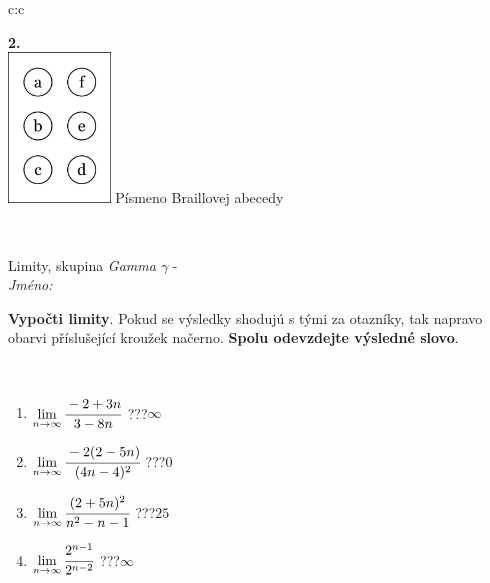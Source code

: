 \documentclass[10pt]{report}
\begin{document}
\begin{tabular}{c:c}
\begin{minipage}[c][104.5mm][t]{0.5\linewidth}
\begin{center}
\begin{minipage}{0.20\linewidth}
\begin{center}
{\Huge\bfseries 2.} \\[2mm]
\includegraphics[height=40mm]{../images/braille.png}
{\small Písmeno Braillovej abecedy}
\end{center}
\end{minipage}
\end{center}
\end{minipage}
\\ \hdashline
\begin{minipage}[c][104.5mm][t]{0.5\linewidth}
\begin{center}
\vspace{7mm}
{\huge Limity, skupina \textit{Gamma $\gamma$} -}\\[5mm]
\textit{Jméno:}\phantom{xxxxxxxxxxxxxxxxxxxxxxxxxxxxxxxxxxxxxxxxxxxxxxxxxxxxxxxxxxxxxxxxx}\\[5mm]
\begin{minipage}{0.95\linewidth}
\begin{center}
\textbf{Vypočti limity}. Pokud se výsledky shodujú s tými za otazníky, tak napravo\\obarvi příslušející kroužek načerno. \textbf{Spolu odevzdejte výsledné slovo}.
\end{center}
\end{minipage}
\\[1mm]
\begin{minipage}{0.79\linewidth}
\begin{center}
\begin{varwidth}{\linewidth}
\begin{enumerate}
\normalsize
\item $\lim\limits_{n\to\infty}\cfrac{-2+3n}{3-8n}$\quad \dotfill\; ???\;\dotfill \quad $\infty$
\item $\lim\limits_{n\to\infty}\cfrac{-2(2-5n)}{(4n-4)^2}$\quad \dotfill\; ???\;\dotfill \quad $0$
\item $\lim\limits_{n\to\infty}\cfrac{(2+5n)^2}{n^2-n-1}$\quad \dotfill\; ???\;\dotfill \quad $25$
\item $\lim\limits_{n\to\infty}\cfrac{2^{n-1}}{2^{n-2}}$\quad \dotfill\; ???\;\dotfill \quad $\infty$

\end{enumerate}
\end{varwidth}
\end{center}
\end{minipage}
\end{center}
\end{minipage}
\end{tabular}
\end{document}
